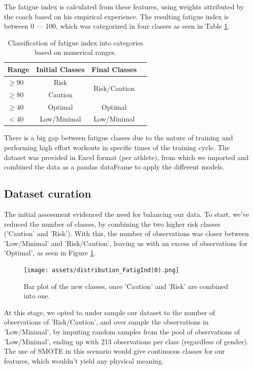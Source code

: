 \documentclass[conference]{IEEEtran}
\begin{document}
The fatigue index is calculated from these features, using weights attributed by the coach based on his empirical experience. The resulting fatigue index is between 0 — 100, which was categorized in four classes as seen in Table \ref{classTable}. 


\begin{table}[H]
\centering
\caption{Classification of fatigue index into categories based on numerical ranges.}
\label{classTable}
\begin{tabular}{lccc}
\toprule
\textbf{Range} & \textbf{Initial Classes} & \textbf{Final Classes} \\
\midrule
$\geq  90$ & Risk & \multirow{2}{*}{Risk/Caution} \\
$\geq  80$ & Caution & \\
$\geq 40$ & Optimal & Optimal \\
$< 40$ & Low/Minimal & Low/Minimal \\
\bottomrule
\end{tabular}
\end{table}


There is a big gap between fatigue classes due to the nature of training and performing high effort workouts in specific times of the training cycle. The dataset was provided in Excel format (per athlete), from which we imported and combined the data as a pandas dataFrame to apply the different models.



\subsection{Dataset curation}

The initial assessment evidenced the need for balancing our data. To start, we've reduced the number of classes, by combining the two higher risk classes ('Caution' and 'Risk'). With this, the number of observations was closer between 'Low/Minimal' and 'Risk/Caution', leaving us with an excess of observations for 'Optimal', as seen in Figure \ref{histClasses}. 

\begin{figure}[H]
    \centering
    \texttt{[image: assets/distribution\_FatigInd(0).png]}
    \caption{Bar plot of the new classes, once 'Caution' and 'Risk' are combined into one.}
    \label{histClasses}
\end{figure}

At this stage, we opted to under sample our dataset to the number of observations of 'Risk/Caution', and over sample the observations in 'Low/Minimal', by imputing random samples from the pool of observations of 'Low/Minimal', ending up with 213 observations per class (regardless of gender). The use of SMOTE in this scenario would give continuous classes for our features, which wouldn't yield any physical meaning.
\end{document}
